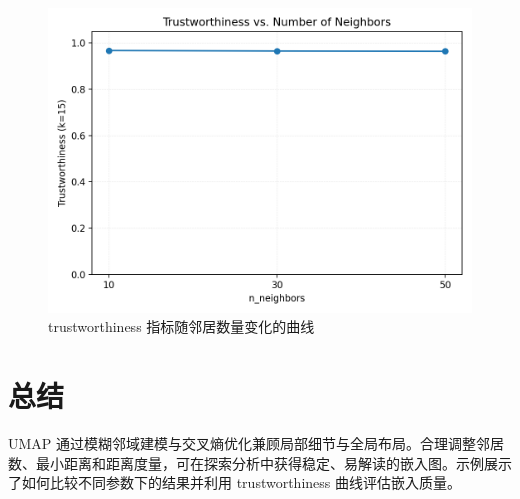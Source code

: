\documentclass[UTF8,zihao=-4]{ctexart}
\begin{document}
\begin{figure}[H]
  \centering
  \includegraphics[width=0.8\linewidth]{umap_neighbor_curve.png}
  \caption{trustworthiness 指标随邻居数量变化的曲线}
  \label{fig:umap_neighbor_curve_cn}
\end{figure}

\FloatBarrier
\section{总结}
UMAP 通过模糊邻域建模与交叉熵优化兼顾局部细节与全局布局。合理调整邻居数、最小距离和距离度量，可在探索分析中获得稳定、易解读的嵌入图。示例展示了如何比较不同参数下的结果并利用 trustworthiness 曲线评估嵌入质量。
\end{document}
